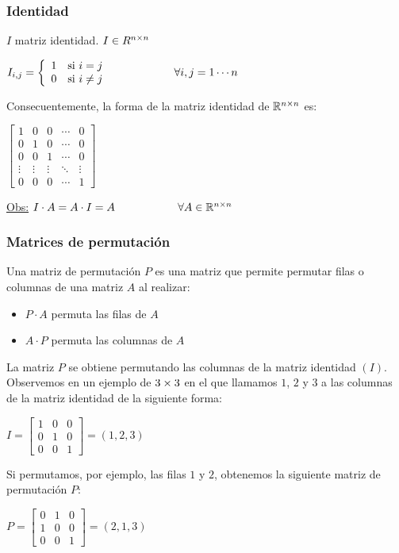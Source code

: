 \subsubsection{Identidad} $I$ matriz identidad. $I \in R^{n\times n}$
	\begin{center}$I_{i,j} =
		\left\{ \begin{array}{lll} 1 & \mbox{si } i=j \\ 0 & \mbox{si } i\neq j \end{array} \right. \hspace{2cm} \forall i,j=1\cdots n$
	\end{center}
	Consecuentemente, la forma de la matriz identidad de $\mathbb{R}^{n\times n}$ es:
	\begin{center}
		$\begin{bmatrix}
			1 & 0 & 0 & \cdots & 0 \\
			0 & 1 & 0 & \cdots & 0 \\
			0 & 0 & 1 & \cdots & 0 \\
			\vdots & \vdots & \vdots & \ddots & \vdots \\
			0 & 0 & 0 & \cdots & 1
		\end{bmatrix}$
	\end{center}

\underline{Obs:} $I \cdot A = A \cdot I = A \hspace{2cm} \forall A\in\mathbb{R}^{n\times n}$

\subsubsection{Matrices de permutación}
Una matriz de permutación $P$ es una matriz que permite permutar filas o columnas de una matriz $A$ al realizar:
\begin{itemize}
	\item $P \cdot A$ permuta las filas de $A$
	\item $A \cdot P$ permuta las columnas de $A$
\end{itemize}

La matriz $P$ se obtiene permutando las columnas de la matriz identidad $(I)$. Observemos en un ejemplo de $3 \times 3$ en el que llamamos $1$, $2$ y $3$ a las columnas de la matriz identidad de la siguiente forma:
\begin{center}
	$I = \begin{bmatrix}
		1&0&0\\
		0&1&0\\
		0&0&1
	\end{bmatrix} = (1,2,3)$
\end{center}

Si permutamos, por ejemplo, las filas $1$ y $2$, obtenemos la siguiente matriz de permutación $P$:
\begin{center}
	$P=\begin{bmatrix}
		0&1&0\\
		1&0&0\\
		0&0&1
	\end{bmatrix} = (2,1,3)$
\end{center}

